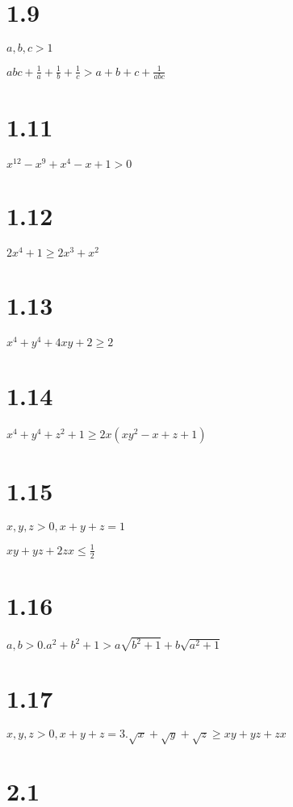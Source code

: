 \documentclass{article}
\begin{document}
\section*{1.9}

$a, b, c > 1$

$abc + \frac{1}{a} + \frac{1}{b} + \frac{1}{c} > a + b + c + \frac{1}{abc}$

\section*{1.11}

$x^12 - x^9 + x^4 - x + 1 > 0$

\section*{1.12}

$2x^4 + 1 \ge 2x^3 + x^2$

\section*{1.13}

$x^4 + y^4 + 4xy + 2 \ge 2$

\section*{1.14}

$x^4 + y^4 + z^2 + 1 \ge 2x(xy^2 - x + z + 1)$

\section*{1.15}

$x, y, z > 0, x + y + z = 1$

$xy + yz + 2zx \le \frac{1}{2}$

\section*{1.16}

$a, b > 0. a^2 + b^2 + 1 > a\sqrt{b^2 + 1} + b\sqrt{a^2 + 1}$

\section*{1.17}

$x, y, z > 0, x + y + z = 3. \sqrt{x} + \sqrt{y} + \sqrt{z} \ge xy + yz + zx$

\section*{2.1}
\end{document}
